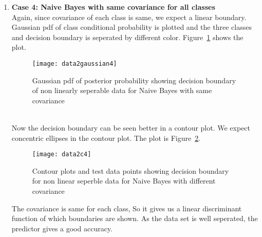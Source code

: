 \documentclass[11pt,paper=a4,answers]{exam}
\begin{document}
\begin{questions}
\begin{enumerate}[i.]
\begin{enumerate}
            \item \textbf{Case 4: Naive Bayes with same covariance for all classes}\\
            Again, since covariance of each class is same, we expect a linear boundary. Gaussian pdf of class conditional probability is plotted and the three classes and decision boundary is seperated by different color. Figure~\ref{fig:data2g4} shows the plot.
            \begin{figure}[ht]
                \centering
                \texttt{[image: data2gaussian4]}
                \vspace{-30pt}
                \caption{Gaussian pdf of posterior probability showing decision boundary of non linearly seperable data for Naive Bayes with same covariance}
                \label{fig:data2g4}
            \end{figure}\\
            Now the decision boundary can be seen better in a contour plot. We expect concentric ellipses in the contour plot. The plot is Figure~\ref{fig:data2c4}.\\ 
            \begin{figure}[ht]
                \centering
                \texttt{[image: data2c4]}
                \vspace{-30pt}
                \caption{Contour plots and test data points showing decision boundary for non linear seperble data for Naive Bayes with different covariance}
                \label{fig:data2c4}
            \end{figure}
            The covariance is same for each class, So it gives us a linear discriminant function of which boundaries are shown. As the data set is well seperated, the predictor gives a good accuracy.


\end{enumerate}
\end{enumerate}
\end{questions}
\end{document}
